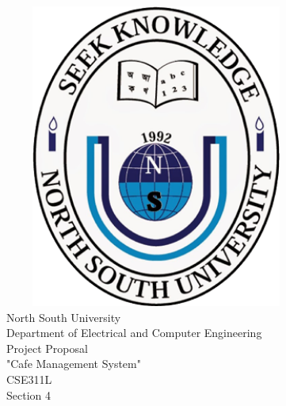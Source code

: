 \documentclass{article}
\begin{document}
\begin{center}
    \includegraphics[width=10cm, height=10cm]{logo_nsu_1.png}\\
    \vspace{5mm} %
    {\huge North South University}\\
    \vspace{3mm} %
        Department of Electrical and Computer Engineering\\
    \vspace{3mm} %
        Project Proposal\\
     \vspace{3mm} %
     {\huge "Cafe Management System"}\\
     \vspace{3mm} %
     CSE311L\\Section 4\\
\end{center}


\end{document}

